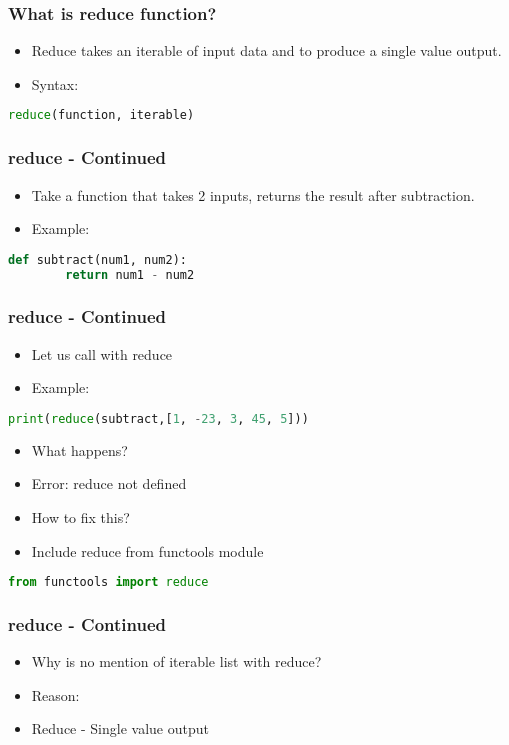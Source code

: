 \documentclass[14pt]{beamer}
\begin{document}
    \begin{frame}[containsverbatim]
        \frametitle{What is reduce function?}
        \begin{itemize}
            \item Reduce takes an iterable of input data and to produce a single value output.
            \item \alert{Syntax:}
        \end{itemize}
        \begin{lstlisting}[language=Python]
	reduce(function, iterable)
        \end{lstlisting}
    \end{frame}
    \begin{frame}[containsverbatim]
        \frametitle{reduce - Continued}
		\begin{itemize}
		\item Take a function that takes 2 inputs, returns the result after subtraction.
        \item \alert{Example:}
        \end{itemize}
        \begin{lstlisting}[language=Python]
	def subtract(num1, num2):
		return num1 - num2
        \end{lstlisting}
    \end{frame}
    \begin{frame}[containsverbatim]
        \frametitle{reduce - Continued}
		\begin{itemize}
		\item Let us call with reduce
        \item \alert{Example:}
        \end{itemize}
        \begin{lstlisting}[language=Python]
print(reduce(subtract,[1, -23, 3, 45, 5]))
        \end{lstlisting}
		\begin{itemize}
		\item What happens?
        \item \alert{Error: reduce not defined}
        \item \alert{How to fix this?}
        \item \alert {Include reduce from functools module}
        \end{itemize}
        \begin{lstlisting}[language=Python]
from functools import reduce
        \end{lstlisting}
    \end{frame}
    \begin{frame}[containsverbatim]
        \frametitle{reduce - Continued}
		\begin{itemize}
		\item Why is no mention of iterable list with reduce?
        \item \alert{Reason:}
        \item Reduce - Single value output 
        \end{itemize}
    \end{frame}
\end{document}

